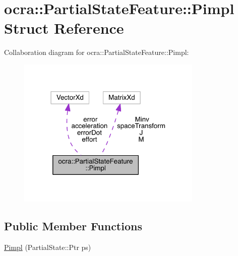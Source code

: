 \hypertarget{structocra_1_1PartialStateFeature_1_1Pimpl}{}\section{ocra\+:\+:Partial\+State\+Feature\+:\+:Pimpl Struct Reference}
\label{structocra_1_1PartialStateFeature_1_1Pimpl}


Collaboration diagram for ocra\+:\+:Partial\+State\+Feature\+:\+:Pimpl\+:\nopagebreak
\begin{figure}[H]
\begin{center}
\leavevmode
\includegraphics[width=250pt]{d9/d83/structocra_1_1PartialStateFeature_1_1Pimpl__coll__graph}
\end{center}
\end{figure}
\subsection*{Public Member Functions}
\begin{DoxyCompactItemize}
\item 
\hyperlink{structocra_1_1PartialStateFeature_1_1Pimpl_ab528ba7c9763bcdee5e89cca9a18defd}{Pimpl} (Partial\+State\+::\+Ptr ps)
\end{DoxyCompactItemize}
